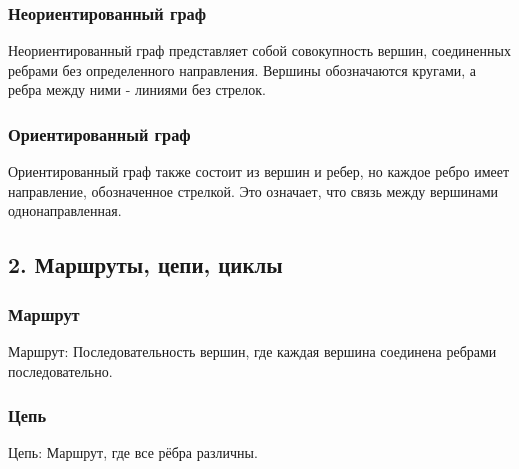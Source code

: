 \documentclass{article}
\begin{document}
\subsubsection*{Неориентированный граф}
Неориентированный граф представляет собой совокупность вершин, соединенных ребрами без определенного направления. Вершины обозначаются кругами, а ребра между ними - линиями без стрелок.



\subsubsection*{Ориентированный граф}
Ориентированный граф также состоит из вершин и ребер, но каждое ребро имеет направление, обозначенное стрелкой. Это означает, что связь между вершинами однонаправленная.



\pagebreak

\subsection*{2. Маршруты, цепи, циклы} 
\subsubsection*{Маршрут}
Маршрут: Последовательность вершин, где каждая вершина соединена ребрами последовательно.


\subsubsection*{Цепь}
Цепь: Маршрут, где все рёбра различны.
\end{document}
